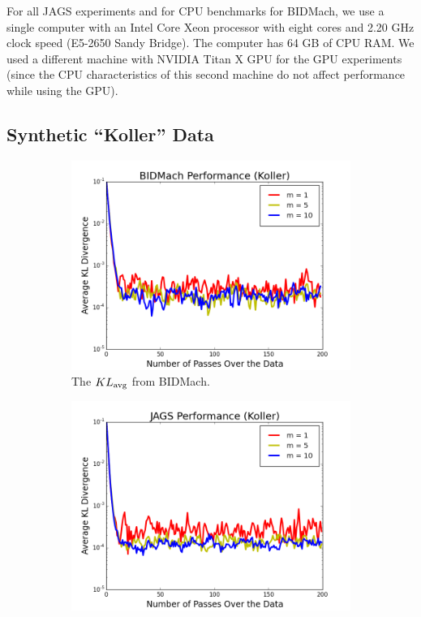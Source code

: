 \documentclass{article} %
\begin{document}
For all JAGS experiments and for CPU benchmarks for BIDMach, we use a
single computer with an Intel Core Xeon processor with eight cores and
2.20 GHz clock speed (E5-2650 Sandy Bridge). The computer has 64 GB of
CPU RAM. We used a different machine with NVIDIA Titan X GPU for the
GPU experiments (since the CPU characteristics of this second machine
do not affect performance while using the GPU).

\subsection{Synthetic ``Koller'' Data}\label{ssec:koller_data}

\begin{figure}[t]
\centering
\begin{subfigure}{.5\textwidth}
  \centering
  \includegraphics[width=0.9\linewidth]{fig_kldiv_koller_mb4_gpu}
  \caption{The $KL_{\rm avg}$ from BIDMach.}
  \label{fig:kl_bidmach}
\end{subfigure}%
\begin{subfigure}{.5\textwidth}
  \centering
  \includegraphics[width=0.9\linewidth]{fig_kldiv_50perc_jags}

\end{subfigure}
\end{figure}
\end{document}
